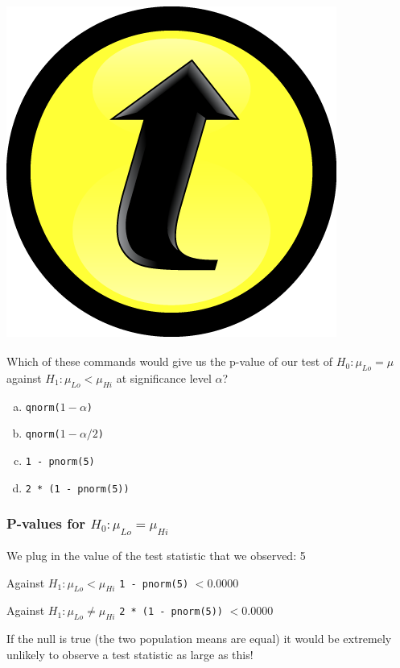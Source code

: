\documentclass[handout]{beamer}
\begin{document}
\begin{frame}
\frametitle{\hfill \includegraphics[scale = 0.05]{./images/clicker}}
Which of these commands would give us the p-value of our test of $H_0\colon \mu_{Lo} = \mu$ against $H_1\colon \mu_{Lo}<\mu_{Hi}$ at significance level $\alpha$?
\vspace{1em}
	\begin{enumerate}[(a)]
		\item \texttt{qnorm($1-\alpha$)}
		\item \texttt{qnorm($1-\alpha/2$)}
		\item \texttt{1 - pnorm(5)}
		\item \texttt{2 * (1 - pnorm(5))}
	\end{enumerate}
	

\end{frame}

\begin{frame}
\frametitle{P-values for $H_0\colon \mu_{Lo} = \mu_{Hi}$}
We plug in the value of the test statistic that we observed: 5
\begin{block}{Against $H_1\colon \mu_{Lo}< \mu_{Hi}$}
\texttt{1 - pnorm(5)} $< 0.0000$
\end{block}

\begin{block}{Against $H_1\colon \mu_{Lo}\neq \mu_{Hi}$}
\texttt{2 * (1 - pnorm(5))} $< 0.0000$
\end{block}

\vspace{1em}

\alert{If the null is true (the two population means are equal) it would be extremely unlikely to observe a test statistic as large as this!}

\end{frame}
\end{document}
